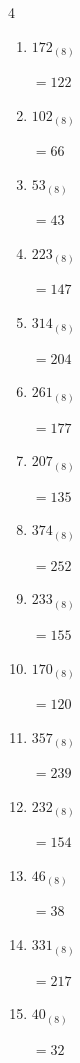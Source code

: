 \newpage
\resetdrill

\begin{multicols}{4}
\begin{enumerate}
  \itemsep=10pt
  \item $172_{(8)}$

        $=122$

  \item $102_{(8)}$

        $=66$

  \item $53_{(8)}$

        $=43$

  \item $223_{(8)}$

        $=147$

  \item $314_{(8)}$

        $=204$

  \item $261_{(8)}$

        $=177$

  \item $207_{(8)}$

        $=135$

  \item $374_{(8)}$

        $=252$

  \item $233_{(8)}$

        $=155$

  \item $170_{(8)}$

        $=120$

  \item $357_{(8)}$

        $=239$

  \item $232_{(8)}$

        $=154$

  \item $46_{(8)}$

        $=38$

  \item $331_{(8)}$

        $=217$

  \item $40_{(8)}$

        $=32$

\columnbreak %


\end{enumerate}
\end{multicols}
